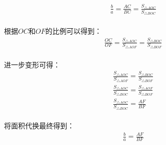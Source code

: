 \documentclass[UTF8]{ctexart}
\begin{document}
    \setcounter{equation}{0}
    \begin{align}
        &\frac{b}{a}=\frac{AC}{BC}=\frac{S_{\triangle AOC}}{S_{\triangle BOC}}
    \end{align}\\
    根据$OC$和$OF$的比例可以得到：
    \begin{align}
        &\frac{OC}{OF}=\frac{S_{\triangle AOC}}{S_{\triangle AOF}}=\frac{S_{\triangle BOC}}{S_{\triangle BOF}}
    \end{align}\\
    进一步变形可得：
    \begin{align}
        &\frac{S_{\triangle AOC}}{S_{\triangle AOF}}=\frac{S_{\triangle BOC}}{S_{\triangle BOF}}\\[3mm]
        &\frac{S_{\triangle AOC}}{S_{\triangle BOC}}=\frac{S_{\triangle AOF}}{S_{\triangle BOF}}\\[3mm]
        &\frac{S_{\triangle AOC}}{S_{\triangle BOC}}=\frac{AF}{BF}
    \end{align}\\
    将面积代换最终得到：
    \begin{align}
        &\frac{b}{a}=\frac{AF}{BF}
    \end{align}
    
\newpage
\end{document}
